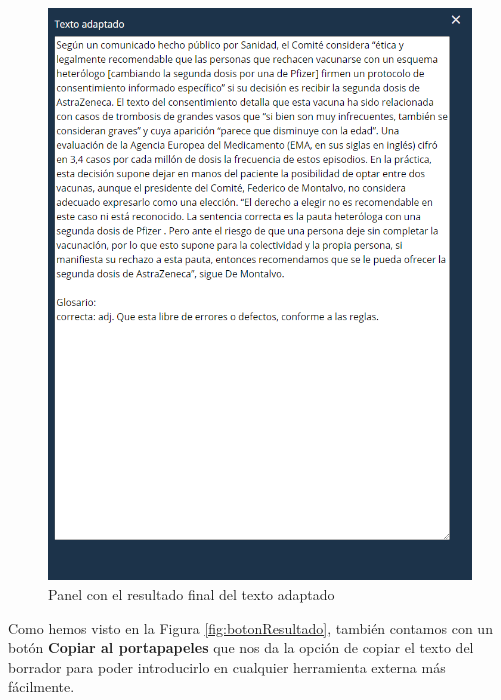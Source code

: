\begin{figure}[h!]
	\centering
	
	
	\includegraphics[scale=0.8]{Imagenes/Figuras/PanelDerecho}
	
	
	\caption{Panel con el resultado final del texto adaptado}
	\label{fig:panelFinal}
\end{figure}

Como hemos visto en la Figura \ref{fig:botonResultado}, también contamos con un botón \textbf{Copiar al portapapeles} que nos da la opción de copiar el texto del borrador para poder introducirlo en cualquier herramienta externa más fácilmente.


